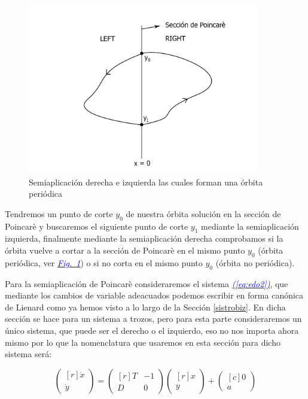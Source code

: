 \documentclass[12pt,a4paper]{report} %
\newcommand{\fref}[1]{\hyperref[#1]{\textcolor{blue}{\textit{Fig.~\ref*{#1}}}}}
\newcommand{\eref}[1]{\hyperref[#1]{\textcolor{blue}{\textit{(\ref*{#1})}}}}
\begin{document}
	\begin{figure}[h]
		\centering
		\includegraphics[width=0.9\textwidth]{poincaLR.jpg}
		\caption{Semiaplicación derecha e izquierda las cuales forman una órbita periódica}
		\label{fig:poincaLR}
	\end{figure}\smallskip
	
	Tendremos un punto de corte $y_0$ de nuestra órbita solución en la sección de Poincarè y buscaremos el siguiente punto de corte $y_1$ mediante la semiaplicación izquierda, finalmente mediante la semiaplicación derecha comprobamos si la órbita vuelve a cortar a la sección de Poincarè en el mismo punto $y_0$ (órbita periódica, ver \fref{fig:poincaLR}) o si no corta en el mismo punto $y_0$ (órbita no periódica).
	
	\vspace{0.5cm}Para la semiaplicación de Poincarè consideraremos el sistema \eref{eq:edo2}, que mediante los cambios de variable adeacuados podemos escribir en forma canónica de Lienard como ya hemos visto a lo largo de la Sección \ref{sistrobiz}. En dicha sección se hace para un sistema a trozos, pero para esta parte consideraremos un único sistema, que puede ser el derecho o el izquierdo, eso no nos importa ahora mismo por lo que la nomenclatura que usaremos en esta sección para dicho sistema será:
	
		\begin{equation}
		\label{eq:lienardsolo}
		\begin{pmatrix*}[r]
			\dot{x}\\ \dot{y}
		\end{pmatrix*}= \begin{pmatrix*}[r]
			T & -1 \\ D & 0
		\end{pmatrix*} \begin{pmatrix*}[r]
			x \\ y
		\end{pmatrix*}+\begin{pmatrix*}[c]
			0 \\ a
		\end{pmatrix*}
	\end{equation}\smallskip
	\newpage
	
\end{document}

